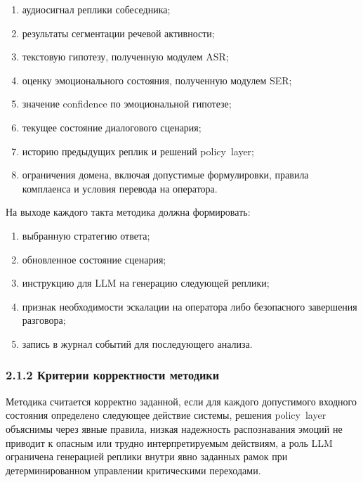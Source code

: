\documentclass[a4paper,14pt]{extarticle}
\renewcommand{\texttt}[1]{\textnormal{#1}}
\providecommand{\tightlist}{%
  \setlength{\itemsep}{0pt}\setlength{\parskip}{0pt}}
\begin{document}
\begin{enumerate}
\def\labelenumi{\arabic{enumi})}
\tightlist
\item
  аудиосигнал реплики собеседника;
\item
  результаты сегментации речевой активности;
\item
  текстовую гипотезу, полученную модулем \texttt{ASR};
\item
  оценку эмоционального состояния, полученную модулем \texttt{SER};
\item
  значение \texttt{confidence} по эмоциональной гипотезе;
\item
  текущее состояние диалогового сценария;
\item
  историю предыдущих реплик и решений \texttt{policy\ layer};
\item
  ограничения домена, включая допустимые формулировки, правила
  комплаенса и условия перевода на оператора.
\end{enumerate}

На выходе каждого такта методика должна формировать:

\begin{enumerate}
\def\labelenumi{\arabic{enumi})}
\tightlist
\item
  выбранную стратегию ответа;
\item
  обновленное состояние сценария;
\item
  инструкцию для \texttt{LLM} на генерацию следующей реплики;
\item
  признак необходимости эскалации на оператора либо безопасного
  завершения разговора;
\item
  запись в журнал событий для последующего анализа.
\end{enumerate}

\subsubsection{2.1.2 Критерии корректности
методики}\label{ux43aux440ux438ux442ux435ux440ux438ux438-ux43aux43eux440ux440ux435ux43aux442ux43dux43eux441ux442ux438-ux43cux435ux442ux43eux434ux438ux43aux438}

Методика считается корректно заданной, если для каждого допустимого
входного состояния определено следующее действие системы, решения
\texttt{policy\ layer} объяснимы через явные правила, низкая надежность
распознавания эмоций не приводит к опасным или трудно интерпретируемым
действиям, а роль \texttt{LLM} ограничена генерацией реплики внутри явно
заданных рамок при детерминированном управлении критическими переходами.
\end{document}
